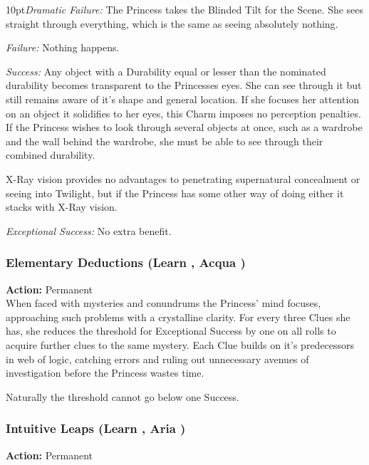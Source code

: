     \begin{myindentpar}{10pt}\emph{Dramatic Failure:} The Princess takes the Blinded Tilt for the Scene. She sees straight through everything, which is the same as seeing absolutely nothing. 

    \emph{Failure:} Nothing happens.

    \emph{Success:} Any object with a Durability equal or lesser than the nominated durability becomes transparent to the Princesses eyes. She can see through it but still remains aware of it's shape and general location. If she focuses her attention on an object it solidifies to her eyes, this Charm imposes no perception penalties. If the Princess wishes to look through several objects at once, such as a wardrobe and the wall behind the wardrobe, she must be able to see through their combined durability. 
	
	X-Ray vision provides no advantages to penetrating supernatural concealment or seeing into Twilight, but if the Princess has some other way of doing either it stacks with X-Ray vision.

    \emph{Exceptional Success:}  No extra benefit.\end{myindentpar}

\subsubsection*{Elementary Deductions (Learn \textbullet, Acqua \textbullet\textbullet)}

\noindent \textbf{Action:} Permanent \\

\noindent When faced with mysteries and conundrums the Princess' mind focuses, approaching such problems with a crystalline clarity. For every three Clues she has, she reduces the threshold for Exceptional Success by one on all rolls to acquire further clues to the same mystery. Each Clue builds on it's predecessors in web of logic, catching errors and ruling out unnecessary avenues of investigation before the Princess wastes time.

Naturally the threshold cannot go below one Success. 

\subsubsection*{Intuitive Leaps (Learn \textbullet, Aria \textbullet\textbullet)}

\noindent \textbf{Action:} Permanent \\

